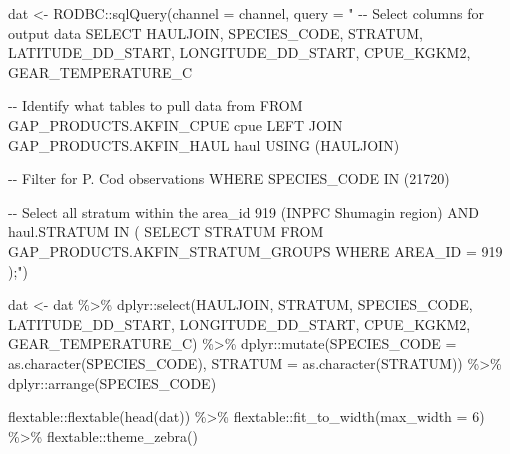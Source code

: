 \documentclass[
  letterpaper,
  oneside,
  open=any]{scrbook}
\newenvironment{Shaded}{\begin{snugshade}}{\end{snugshade}}
\newcommand{\AttributeTok}[1]{\textcolor[rgb]{0.40,0.45,0.13}{#1}}
\newcommand{\DecValTok}[1]{\textcolor[rgb]{0.68,0.00,0.00}{#1}}
\newcommand{\FunctionTok}[1]{\textcolor[rgb]{0.28,0.35,0.67}{#1}}
\newcommand{\NormalTok}[1]{\textcolor[rgb]{0.00,0.23,0.31}{#1}}
\newcommand{\OtherTok}[1]{\textcolor[rgb]{0.00,0.23,0.31}{#1}}
\newcommand{\SpecialCharTok}[1]{\textcolor[rgb]{0.37,0.37,0.37}{#1}}
\newcommand{\StringTok}[1]{\textcolor[rgb]{0.13,0.47,0.30}{#1}}
\begin{document}
\begin{Shaded}
\begin{Highlighting}[]
\NormalTok{dat }\OtherTok{\textless{}{-}}\NormalTok{ RODBC}\SpecialCharTok{::}\FunctionTok{sqlQuery}\NormalTok{(}\AttributeTok{channel =}\NormalTok{ channel,}
                       \AttributeTok{query =}
                         \StringTok{"}
\StringTok{{-}{-} Select columns for output data}
\StringTok{SELECT }
\StringTok{HAULJOIN, }
\StringTok{SPECIES\_CODE, }
\StringTok{STRATUM, }
\StringTok{LATITUDE\_DD\_START, }
\StringTok{LONGITUDE\_DD\_START,}
\StringTok{CPUE\_KGKM2, }
\StringTok{GEAR\_TEMPERATURE\_C}

\StringTok{{-}{-} Identify what tables to pull data from}
\StringTok{FROM GAP\_PRODUCTS.AKFIN\_CPUE cpue}
\StringTok{LEFT JOIN GAP\_PRODUCTS.AKFIN\_HAUL haul}
\StringTok{USING (HAULJOIN) }

\StringTok{{-}{-} Filter for P. Cod observations}
\StringTok{WHERE SPECIES\_CODE IN (21720)}

\StringTok{{-}{-} Select all stratum within the area\_id 919 (INPFC Shumagin region)}
\StringTok{AND haul.STRATUM IN}
\StringTok{(}
\StringTok{SELECT }
\StringTok{STRATUM}
\StringTok{FROM GAP\_PRODUCTS.AKFIN\_STRATUM\_GROUPS }
\StringTok{WHERE AREA\_ID = 919}
\StringTok{);"}\NormalTok{)}
\end{Highlighting}
\end{Shaded}

\begin{Shaded}
\begin{Highlighting}[]
\NormalTok{dat }\OtherTok{\textless{}{-}}\NormalTok{ dat }\SpecialCharTok{\%\textgreater{}\%} 
\NormalTok{  dplyr}\SpecialCharTok{::}\FunctionTok{select}\NormalTok{(HAULJOIN, STRATUM, SPECIES\_CODE, LATITUDE\_DD\_START, LONGITUDE\_DD\_START, CPUE\_KGKM2, GEAR\_TEMPERATURE\_C) }\SpecialCharTok{\%\textgreater{}\%} 
\NormalTok{  dplyr}\SpecialCharTok{::}\FunctionTok{mutate}\NormalTok{(}\AttributeTok{SPECIES\_CODE =} \FunctionTok{as.character}\NormalTok{(SPECIES\_CODE), }
                \AttributeTok{STRATUM =} \FunctionTok{as.character}\NormalTok{(STRATUM)) }\SpecialCharTok{\%\textgreater{}\%} 
\NormalTok{  dplyr}\SpecialCharTok{::}\FunctionTok{arrange}\NormalTok{(SPECIES\_CODE)}

\NormalTok{flextable}\SpecialCharTok{::}\FunctionTok{flextable}\NormalTok{(}\FunctionTok{head}\NormalTok{(dat)) }\SpecialCharTok{\%\textgreater{}\%}   
\NormalTok{  flextable}\SpecialCharTok{::}\FunctionTok{fit\_to\_width}\NormalTok{(}\AttributeTok{max\_width =} \DecValTok{6}\NormalTok{) }\SpecialCharTok{\%\textgreater{}\%} 
\NormalTok{  flextable}\SpecialCharTok{::}\FunctionTok{theme\_zebra}\NormalTok{()}
\end{Highlighting}
\end{Shaded}
\end{document}
